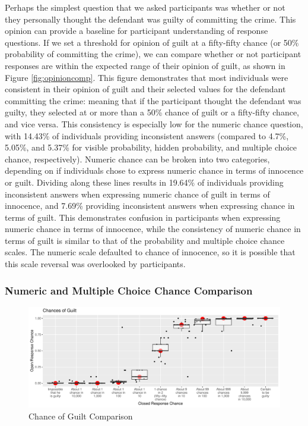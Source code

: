 \documentclass[print]{nuthesis}
\begin{document}
Perhaps the simplest question that we asked participants was whether or not they personally thought the defendant was guilty of committing the crime.
This opinion can provide a baseline for participant understanding of response questions.
If we set a threshold for opinion of guilt at a fifty-fifty chance (or 50\% probability of committing the crime), we can compare whether or not participant responses are within the expected range of their opinion of guilt, as shown in Figure \ref{fig:opinioncomp}.
This figure demonstrates that most individuals were consistent in their opinion of guilt and their selected values for the defendant committing the crime: meaning that if the participant thought the defendant was guilty, they selected at or more than a 50\% chance of guilt or a fifty-fifty chance, and vice versa.
This consistency is especially low for the numeric chance question, with 14.43\% of individuals providing inconsistent answers (compared to 4.7\%, 5.05\%, and 5.37\% for visible probability, hidden probability, and multiple choice chance, respectively).
Numeric chance can be broken into two categories, depending on if individuals chose to express numeric chance in terms of innocence or guilt.
Dividing along these lines results in 19.64\% of individuals providing inconsistent answers when expressing numeric chance of guilt in terms of innocence, and 7.69\% providing inconsistent answers when expressing chance in terms of guilt.
This demonstrates confusion in participants when expressing numeric chance in terms of innocence, while the consistency of numeric chance in terms of guilt is similar to that of the probability and multiple choice chance scales.
The numeric scale defaulted to chance of innocence, so it is possible that this scale reversal was overlooked by participants.

\hypertarget{numeric-and-multiple-choice-chance-comparison}{%
\subsubsection{Numeric and Multiple Choice Chance Comparison}\label{numeric-and-multiple-choice-chance-comparison}}

\begin{figure}

{\centering \includegraphics[width=\linewidth]{thesis_files/figure-latex/likecomp1-1} 

}

\caption{Chance of Guilt Comparison}\label{fig:likecomp1}
\end{figure}
\end{document}
